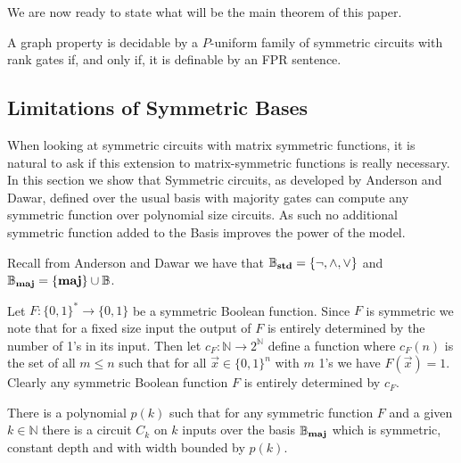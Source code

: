 \documentclass[../paper.tex]{subfiles}
\begin{document}


We are now ready to state what will be the main theorem of this paper.
\begin{thm}
  A graph property is decidable by a $P$-uniform family of symmetric circuits
  with rank gates if, and only if, it is definable by an FPR sentence.
\end{thm}

\subsection{Limitations of Symmetric Bases}
When looking at symmetric circuits with matrix symmetric functions, it is
natural to ask if this extension to matrix-symmetric functions is really
necessary. In this section we show that Symmetric circuits, as developed by
Anderson and Dawar, defined over the usual basis with majority gates can compute
any symmetric function over polynomial size circuits. As such no additional
symmetric function added to the Basis improves the power of the model.

Recall from Anderson and Dawar \cite{AndersonD17} we have that
$\mathbb{B}_{\text{\textbf{std}}} = \{ \neg , \wedge , \lor \}$ and $\mathbb{B}_{\text{\textbf{maj}}} = \{ \text{\textbf{maj}}
\} \cup \mathbb{B}$.

Let $F: \{0,1\}^* \rightarrow \{0,1\}$ be a symmetric Boolean function. Since
$F$ is symmetric we note that for a fixed size input the output of $F$ is
entirely determined by the number of 1's in its input. Then let
$c_{F}:\mathbb{N} \rightarrow 2^{\mathbb{N}}$ define a function where $c_{F}(n)$
is the set of all $m \leq n$ such that for all $\vec{x} \in \{ 0,1 \}^n$ with
$m$ 1's we have $F (\vec{x}) = 1$. Clearly any symmetric Boolean function $F$ is
entirely determined by $c_{F}$.
 
\begin{prop}
  \label{prop:fuctions-maj}
  There is a polynomial $p(k)$ such that for any symmetric function $F$ and a
  given $k \in \mathbb{N}$ there is a circuit $C_k$ on $k$ inputs over the basis
  $\mathbb{B}_{\text{\textbf{maj}}}$ which is symmetric, constant depth and with width bounded by
  $p(k)$.
\end{prop}
\end{document}
